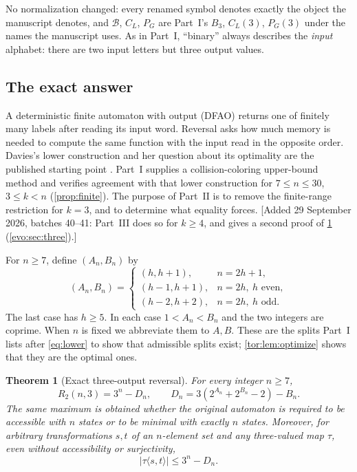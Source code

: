 \documentclass[11pt,a4paper]{article}
\numberwithin{equation}{section}
\newtheorem{theorem}{Theorem}[section]
\theoremstyle{definition}
\theoremstyle{remark}
\newcommand{\Bip}{\mathcal B}
\begin{document}
No normalization changed: every renamed symbol denotes exactly the object the
manuscript denotes, and $\Bip$, $C_L$, $P_G$ are Part~I's $B_3$, $C_L(3)$,
$P_G(3)$ under the names the manuscript uses. As in Part~I, ``binary''
always describes the \emph{input} alphabet: there are two input letters but
three output values.

\subsection{The exact answer}\label{tor:sec:answer}

A deterministic finite automaton with output (DFAO) returns one of finitely
many labels after reading its input word. Reversal asks how much memory is
needed to compute the same function with the input read in the opposite
order. Davies's lower construction and her question about its optimality are
the published starting point \cite[Corollary~3 and Section~5,
Problem~2]{Davies2017}. Part~I supplies a collision-coloring upper-bound
method and verifies agreement with that lower construction for
$7\le n\le30$, $3\le k<n$ (\cref{prop:finite}). The purpose of Part~II is to
remove the finite-range restriction for $k=3$, and to determine what
equality forces. [Added 29 September 2026, batches 40--41: Part~III does so for $k\ge4$, and gives a
second proof of \cref{tor:thm:main} (\cref{evo:sec:three}).]

For $n\ge7$, define $(A_n,B_n)$ by
\begin{equation}\label{tor:eq:split}
 (A_n,B_n)=
 \begin{cases}
 (h,h+1),&n=2h+1,\\
 (h-1,h+1),&n=2h,\ h\text{ even},\\
 (h-2,h+2),&n=2h,\ h\text{ odd}.
 \end{cases}
\end{equation}
The last case has $h\ge5$. In each case $1<A_n<B_n$ and the two integers are
coprime. When $n$ is fixed we abbreviate them to $A,B$. These are the splits
Part~I lists after \eqref{eq:lower} to show that admissible splits exist;
\cref{tor:lem:optimize} shows that they are the optimal ones.

\begin{theorem}[Exact three-output reversal]\label{tor:thm:main}
For every integer $n\ge7$,
\begin{equation}\label{tor:eq:main}
 \boxed{\quad R_2(n,3)=3^n-D_n,\qquad
 D_n=3(2^{A_n}+2^{B_n}-2)-B_n.\quad}
\end{equation}
The same maximum is obtained whether the original automaton is required to be
accessible with $n$ states or to be minimal with exactly $n$ states.
Moreover, for arbitrary transformations $s,t$ of an $n$-element set and any
three-valued map $\tau$, even without accessibility or surjectivity,
\begin{equation}\label{tor:eq:algebraicmain}
 |\tau\langle s,t\rangle|\le3^n-D_n.
\end{equation}
\end{theorem}
\end{document}
